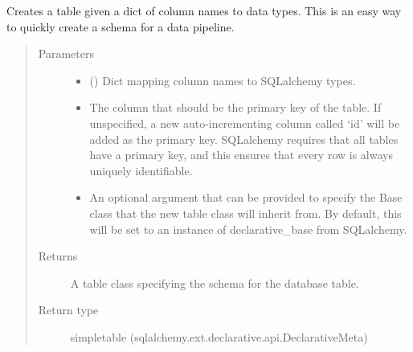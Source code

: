 \documentclass[letterpaper,10pt,english]{sphinxmanual}
\begin{document}
\begin{fulllineitems}
\label{\detokenize{Fireworks:Fireworks.extensions.database.create_table}}
Creates a table given a dict of column names to data types. This is an easy
way to quickly create a schema for a data pipeline.
\begin{quote}\begin{description}
\item[{Parameters}] \leavevmode\begin{itemize}
\item {} 
 () \textendash{} Dict mapping column names to SQLalchemy types.

\item {} 
 \textendash{} The column that should be the primary key of the table. If unspecified, a new auto-incrementing column called ‘id’
will be added as the primary key. SQLalchemy requires that all tables have a primary key, and this ensures that every row
is always uniquely identifiable.

\item {} 
 \textendash{} An optional argument that can be provided to specify the Base class that the new table class will inherit from. By
default, this will be set to an instance of declarative\_base from SQLalchemy.

\end{itemize}

\item[{Returns}] \leavevmode
A table class specifying the schema for the database table.

\item[{Return type}] \leavevmode
simpletable (sqlalchemy.ext.declarative.api.DeclarativeMeta)

\end{description}\end{quote}

\end{fulllineitems}

\end{document}
